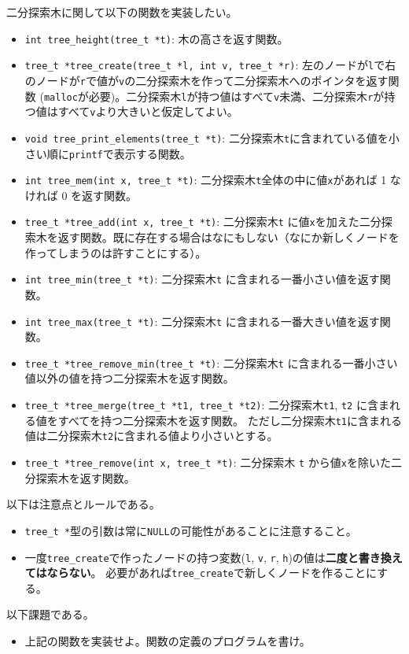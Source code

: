\documentclass[a4paper,twoside,onecolumn,openany,article]{memoir}
\theoremstyle{remark}
\begin{document}
二分探索木に関して以下の関数を実装したい。
\begin{itemize}
\item \texttt{int tree\_height(tree\_t *t)}: 木の高さを返す関数。
\item \texttt{tree\_t *tree\_create(tree\_t *l, int v, tree\_t *r)}: 左のノードが\texttt{l}で右のノードが\texttt{r}で値が\texttt{v}の二分探索木を作って二分探索木へのポインタを返す関数
(\texttt{malloc}が必要)。二分探索木\texttt{l}が持つ値はすべて\texttt{v}未満、二分探索木\texttt{r}が持つ値はすべて\texttt{v}より大きいと仮定してよい。
\item \texttt{void tree\_print\_elements(tree\_t *t)}: 二分探索木\texttt{t}に含まれている値を小さい順に\texttt{printf}で表示する関数。
\item \texttt{int tree\_mem(int x, tree\_t *t)}: 二分探索木\texttt{t}全体の中に値\texttt{x}があれば 1 なければ 0 を返す関数。
\item \texttt{tree\_t *tree\_add(int x, tree\_t *t)}: 二分探索木\texttt{t} に値\texttt{x}を加えた二分探索木を返す関数。既に存在する場合はなにもしない（なにか新しくノードを作ってしまうのは許すことにする）。
\item \texttt{int tree\_min(tree\_t *t)}: 二分探索木\texttt{t} に含まれる一番小さい値を返す関数。
\item \texttt{int tree\_max(tree\_t *t)}: 二分探索木\texttt{t} に含まれる一番大きい値を返す関数。
\item \texttt{tree\_t *tree\_remove\_min(tree\_t *t)}: 二分探索木\texttt{t} に含まれる一番小さい値以外の値を持つ二分探索木を返す関数。
\item \texttt{tree\_t *tree\_merge(tree\_t *t1, tree\_t *t2)}: 二分探索木\texttt{t1}, \texttt{t2} に含まれる値をすべてを持つ二分探索木を返す関数。
ただし二分探索木\texttt{t1}に含まれる値は二分探索木\texttt{t2}に含まれる値より小さいとする。
\item \texttt{tree\_t *tree\_remove(int x, tree\_t *t)}: 二分探索木 \texttt{t} から値\texttt{x}を除いた二分探索木を返す関数。
\end{itemize}
以下は注意点とルールである。
\begin{itemize}
\item \texttt{tree\_t *}型の引数は常に\texttt{NULL}の可能性があることに注意すること。
\item 一度\texttt{tree\_create}で作ったノードの持つ変数(\texttt{l}, \texttt{v}, \texttt{r}, \texttt{h})の値は\textbf{二度と書き換えてはならない}。
必要があれば\texttt{tree\_create}で新しくノードを作ることにする。
\end{itemize}
以下課題である。
\begin{itemize}
\item 上記の関数を実装せよ。関数の定義のプログラムを書け。
\end{itemize}
\end{document}
